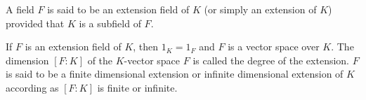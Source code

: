 A field $F$ is said to be an extension field of $K$ (or simply an extension of $K$) provided that $K$ is a subfield of $F$.

If $F$ is an extension field of $K$, then $1_K = 1_F$ and $F$ is a vector space over $K$. The dimension $[F : K]$ of the $K$-vector space $F$ is called the degree of the extension. $F$ is said to be a finite dimensional extension or infinite dimensional extension of $K$ according as $[F : K]$ is finite or infinite.

